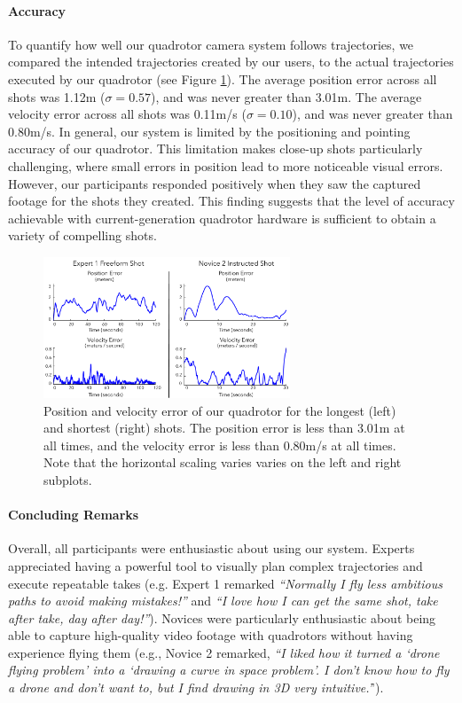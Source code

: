 \paragraph{Accuracy}
To quantify how well our quadrotor camera system follows trajectories, we compared the intended trajectories created by our users, to the actual trajectories executed by our quadrotor (see Figure \ref{fig:errors}).
The average position error across all shots was 1.12m ($\sigma = 0.57$), and was never greater than 3.01m.
The average velocity error across all shots was 0.11m/s ($\sigma = 0.10$), and was never greater than 0.80m/s.
In general, our system is limited by the positioning and pointing accuracy of our quadrotor.
This limitation makes close-up shots particularly challenging, where small errors in position lead to more noticeable visual errors.
However, our participants responded positively when they saw the captured footage for the shots they created.
This finding suggests that the level of accuracy achievable with current-generation quadrotor hardware is sufficient to obtain a variety of compelling shots.

\begin{figure}[t!]
  \centering
  \includegraphics[width=2.9in]{images/2015_siggraph_asia/errors.pdf}
  \caption{
Position and velocity error of our quadrotor for the longest (left) and shortest (right) shots.
The position error is less than 3.01m at all times, and the velocity error is less than 0.80m/s at all times.
Note that the horizontal scaling varies varies on the left and right subplots. 
}
  \label{fig:errors}
\end{figure}

\paragraph{Concluding Remarks}
Overall, all participants were enthusiastic about using our system.
Experts appreciated having a powerful tool to visually plan complex trajectories and execute repeatable takes (e.g. Expert 1 remarked \emph{``Normally I fly less ambitious paths to avoid making mistakes!''} and \emph{``I love how I can get the same shot, take after take, day after day!''}).
Novices were particularly enthusiastic about being able to capture high-quality video footage with quadrotors without having experience flying them (e.g., Novice 2 remarked, \emph{``I liked how it turned a `drone flying problem' into a `drawing a curve in space problem'. I don't know how to fly a drone and don't want to, but I find drawing in 3D very intuitive.'}').
